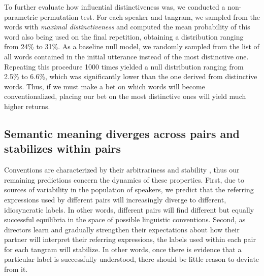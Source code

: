 \documentclass[alpha-refs]{wiley-article}
\begin{document}
To further evaluate how influential distinctiveness was, we conducted a non-parametric permutation test.
For each speaker and tangram, we sampled from the words with \emph{maximal distinctiveness} and computed the mean probability of this word also being used on the final repetition, obtaining a distribution ranging from 24\% to 31\%.
As a baseline null model, we randomly sampled from the list of all words contained in the initial utterance instead of the most distinctive one.
Repeating this procedure 1000 times yielded a null distribution ranging from 2.5\% to 6.6\%, which was significantly lower than the one derived from distinctive words.
Thus, if we must make a bet on which words will become conventionalized, placing our bet on the most distinctive ones will yield much higher returns.

\subsection{Semantic meaning diverges across pairs and stabilizes within pairs}

Conventions are characterized by their arbitrariness and stability \citep{Lewis69_Convention}, thus our remaining predictions concern the dynamics of these properties.
First, due to sources of variability in the population of speakers, we predict that the referring expressions used by different pairs will increasingly diverge to different, idiosyncratic labels.
In other words, different pairs will find different but equally successful equilibria in the space of possible linguistic conventions.
Second, as directors learn and gradually strengthen their expectations about how their partner will interpret their referring expressions, the labels used within each pair for each tangram will stabilize.
In other words, once there is evidence that a particular label is successfully understood, there should be little reason to deviate from it.
\end{document}
